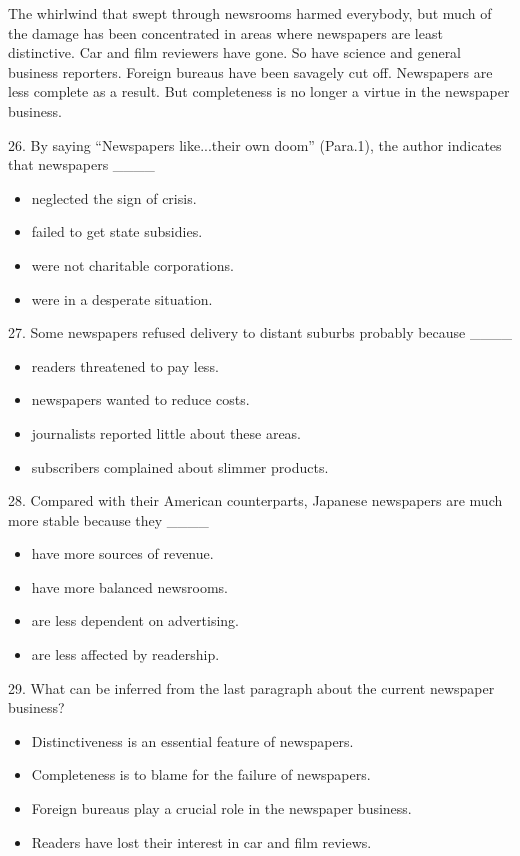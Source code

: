\documentclass[UTF8,11pt]{ctexart}
\begin{document}
The whirlwind that swept through newsrooms harmed everybody, but much of the damage has been concentrated in areas where newspapers are least distinctive. Car and film reviewers have gone. So have science and general business reporters. Foreign bureaus have been savagely cut off. Newspapers are less complete as a result. But completeness is no longer a virtue in the newspaper business.


26. By saying “Newspapers like...their own doom” (Para.1), the author indicates that newspapers \_\_\_\_


\begin{itemize}[leftmargin=2em,itemsep=.2em,topsep=.4em]\item[A.] neglected the sign of crisis.
\item[B.] failed to get state subsidies.
\item[C.] were not charitable corporations.
\item[D.] were in a desperate situation.
\end{itemize}

27. Some newspapers refused delivery to distant suburbs probably because \_\_\_\_


\begin{itemize}[leftmargin=2em,itemsep=.2em,topsep=.4em]\item[A.] readers threatened to pay less.
\item[B.] newspapers wanted to reduce costs.
\item[C.] journalists reported little about these areas.
\item[D.] subscribers complained about slimmer products.
\end{itemize}

28. Compared with their American counterparts, Japanese newspapers are much more stable because they \_\_\_\_


\begin{itemize}[leftmargin=2em,itemsep=.2em,topsep=.4em]\item[A.] have more sources of revenue.
\item[B.] have more balanced newsrooms.
\item[C.] are less dependent on advertising.
\item[D.] are less affected by readership.
\end{itemize}

29. What can be inferred from the last paragraph about the current newspaper business?


\begin{itemize}[leftmargin=2em,itemsep=.2em,topsep=.4em]\item[A.] Distinctiveness is an essential feature of newspapers.
\item[B.] Completeness is to blame for the failure of newspapers.
\item[C.] Foreign bureaus play a crucial role in the newspaper business.
\item[D.] Readers have lost their interest in car and film reviews.
\end{itemize}
\end{document}

